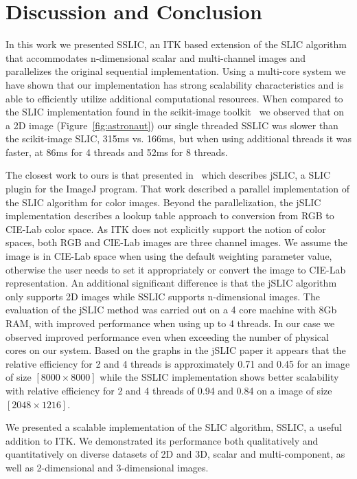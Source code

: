 \documentclass{InsightArticle}
\begin{document}
\section{Discussion and Conclusion}

In this work we presented SSLIC, an ITK based extension of the SLIC algorithm
that accommodates n-dimensional scalar and multi-channel images and parallelizes
the original sequential implementation. Using a multi-core system we have shown
that our implementation has strong scalability characteristics and is able to
efficiently utilize additional computational resources. When compared to the
SLIC implementation found in the scikit-image toolkit~\cite{scikit-image} we
observed that on a 2D image (Figure~\ref{fig:astronaut}) our single threaded
SSLIC was slower than the scikit-image SLIC, 315ms vs. 166ms, but when using
additional threads it was faster, at 86ms for 4 threads and 52ms for 8 threads.

The closest work to ours is that presented in~\cite{borovec2014} which
describes jSLIC, a SLIC plugin for the ImageJ program. That work described a
parallel implementation of the SLIC algorithm for color images. Beyond the
parallelization, the jSLIC implementation describes a lookup table approach to
conversion from RGB to CIE-Lab color space. As ITK does not explicitly support
the notion of color spaces, both RGB and CIE-Lab images are three channel images.
We assume the image is in CIE-Lab space when using the default weighting
parameter value, otherwise the user needs to set it appropriately or convert the
image to CIE-Lab representation. An additional significant difference is that the
jSLIC algorithm only supports 2D images while SSLIC supports n-dimensional
images. The evaluation of the jSLIC method was carried out on a 4 core machine
with 8Gb RAM, with improved performance when using up to 4 threads. In our case
we observed improved performance even when exceeding the number of physical
cores on our system. Based on the graphs in the jSLIC paper it appears that the
relative efficiency for 2 and 4 threads is approximately 0.71 and 0.45 for an
image of size $[8000 \times 8000]$ while the SSLIC implementation shows better
scalability with relative efficiency for 2 and 4 threads of 0.94 and 0.84 on a
image of size $[2048 \times 1216]$.

We presented a scalable implementation of the SLIC algorithm, SSLIC, a useful
addition to ITK. We demonstrated its performance both qualitatively and
quantitatively on diverse datasets of 2D and 3D, scalar and multi-component, as
well as 2-dimensional and 3-dimensional images.
\end{document}
